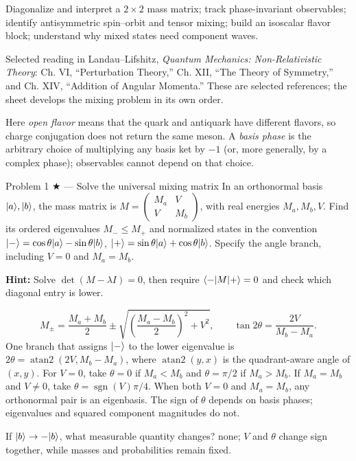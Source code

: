 \documentclass[11pt]{article}
\begin{document}

\begin{goals}
Diagonalize and interpret a $2\times2$ mass matrix; track phase-invariant
observables; identify antisymmetric spin--orbit and tensor mixing; build an
isoscalar flavor block; understand why mixed states need component waves.
\end{goals}
\begin{reading}
Selected reading in Landau--Lifshitz, \emph{Quantum Mechanics: Non-Relativistic
Theory}: Ch. VI, ``Perturbation Theory,'' Ch. XII, ``The Theory of Symmetry,''
and Ch. XIV, ``Addition of Angular Momenta.'' These are selected references;
the sheet develops the mixing problem in its own order.
\end{reading}


Here \emph{open flavor} means that the quark and antiquark have different
flavors, so charge conjugation does not return the same meson. A \emph{basis
phase} is the arbitrary choice of multiplying any basis ket by $-1$ (or, more
generally, by a complex phase); observables cannot depend on that choice.

\begin{problem}{Problem 1 ★ — Solve the universal mixing matrix}
In an orthonormal basis $\lvert a\rangle,\lvert b\rangle$, the mass matrix is
$M=\begin{pmatrix}M_a&V\\V&M_b\end{pmatrix}$, with real energies
$M_a,M_b,V$. Find its ordered eigenvalues $M_-\le M_+$ and normalized
states in the convention
$\lvert -\rangle=\cos\theta\lvert a\rangle-\sin\theta\lvert b\rangle$,
$\lvert +\rangle=\sin\theta\lvert a\rangle+\cos\theta\lvert b\rangle$.
Specify the angle branch, including $V=0$ and $M_a=M_b$.

\textbf{Hint:} Solve $\det(M-\lambda I)=0$, then require
$\langle -\rvert M\lvert +\rangle=0$ and check which diagonal entry is lower.
\end{problem}
\begin{solution}
\[
M_\pm=\frac{M_a+M_b}{2}\pm
\sqrt{\left(\frac{M_a-M_b}{2}\right)^2+V^2},\qquad
\tan2\theta=\frac{2V}{M_b-M_a}.
\]
One branch that assigns $\lvert -\rangle$ to the lower eigenvalue is
$2\theta=\operatorname{atan2}(2V,M_b-M_a)$, where $\operatorname{atan2}(y,x)$
is the quadrant-aware angle of $(x,y)$. For $V=0$, take $\theta=0$ if
$M_a<M_b$ and $\theta=\pi/2$ if $M_a>M_b$. If $M_a=M_b$ and $V\ne0$,
take $\theta=\operatorname{sgn}(V)\pi/4$. When both $V=0$ and $M_a=M_b$,
any orthonormal pair is an eigenbasis.
The sign of $\theta$ depends on basis phases; eigenvalues and squared component
magnitudes do not.
\end{solution}
\begin{quiz}
If $\lvert b\rangle\to-\lvert b\rangle$, what measurable quantity changes? \answer none; $V$ and
$\theta$ change sign together, while masses and probabilities remain fixed.
\end{quiz}
\end{document}
